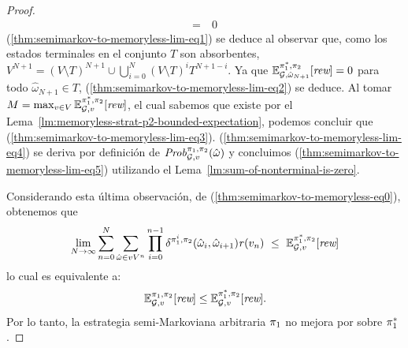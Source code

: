 \begin{proof}
\begin{align}
    = \ & 0  \label{thm:semimarkov-to-memoryless-lim-eq5}
  \end{align}
  (\ref{thm:semimarkov-to-memoryless-lim-eq1}) se deduce al observar que,
  como los estados terminales en el conjunto $T$ son absorbentes,
  $V^{N+1}=(V\setminus T)^{N+1}\cup\bigcup_{i=0}^N(V\setminus T)^iT^{N+1-i}$.
  Ya que
  $\mathbb{E}^{\pi^*_{1}, \pi_{2}}_{\mathcal{G}, \hat{\omega}_{N+1}}[\textit{rew}]=0$
  para todo $\hat{\omega}_{N+1}\in T$, (\ref{thm:semimarkov-to-memoryless-lim-eq2})
  se deduce.
  Al tomar
  $M = \max_{v\in V} \mathbb{E}^{\pi^*_{1}, \pi_{2}}_{\mathcal{G}, v}[\textit{rew}]$,
  el cual sabemos que existe por el Lema~\ref{lm:memoryless-strat-p2-bounded-expectation}, podemos concluir que
  (\ref{thm:semimarkov-to-memoryless-lim-eq3}).
  (\ref{thm:semimarkov-to-memoryless-lim-eq4}) se deriva por definición de
  $\mathit{Prob}^{\pi_{1}, \pi_{2}}_{\mathcal{G},v}(\hat{\omega})$ y concluimos
  (\ref{thm:semimarkov-to-memoryless-lim-eq5}) utilizando
  el Lema~\ref{lm:sum-of-nonterminal-is-zero}.
  

  Considerando esta última observación, de
  (\ref{thm:semimarkov-to-memoryless-eq0}), obtenemos que
  \[
  \lim_{N \rightarrow \infty}	\sum^{N}_{n=0}\sum_{\hat{\omega} \in vV^{n}} \prod^{n-1}_{i=0}\delta^{\strat{1}^i,\strat{2}}(\hat{\omega}_i, \hat{\omega}_{i+1}) \reward(v_n) \ \leq \ \Expect{\starredstrat{1}}{\strat{2}}_{\StochG,v}[\Rewards]
  \]
  lo cual es equivalente a:
  \[
  \mathbb{E}^{\pi_{1}, \pi_{2}}_{\mathcal{G},v}[\textit{rew}] \leq \mathbb{E}^{\pi^*_{1}, \pi_{2}}_{\mathcal{G},v}[\textit{rew}].
  \]
  Por lo tanto, la estrategia semi-Markoviana arbitraria $\pi_{1}$ no mejora por sobre $\pi^*_{1}$.
  \qedhere
\end{proof}

